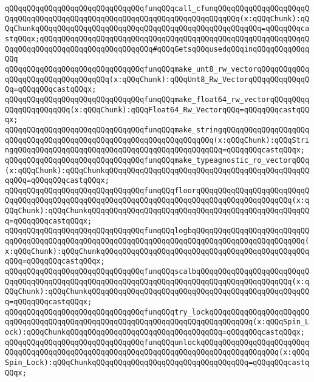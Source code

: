 \verb|qQQqqQQqqQQqqQQqqQQqqQQqqQQqqQQqfunqQQqcall_cfunqQQqqQQqqQQqqQQqqQQqqQQqqQQqqQQqqQQqqQQqqQQqqQQqqQQqqQQqqQQqqQQqqQQqqQQqqQQq(x:qQQqChunk):qQQqChunkqQQqqQQqqQQqqQQqqQQqqQQqqQQqqQQqqQQqqQQqqQQqqQQqqQQq=qQQqqQQqcastqQQqx;qQQqqQQqqQQqqQQqqQQqqQQqqQQqqQQqqQQqqQQqqQQqqQQqqQQqqQQqqQQqqQQqqQQqqQQqqQQqqQQqqQQqqQQqqQQqqQQq#qQQqGetsqQQqusedqQQqinqQQqqQQqqQQqqQQq|\newline
\verb|qQQqqQQqqQQqqQQqqQQqqQQqqQQqqQQqfunqQQqmake_unt8_rw_vectorqQQqqQQqqQQqqQQqqQQqqQQqqQQqqQQqqQQq(x:qQQqChunk):qQQqUnt8_Rw_VectorqQQqqQQqqQQqqQQq=qQQqqQQqcastqQQqx;|\newline
\verb|qQQqqQQqqQQqqQQqqQQqqQQqqQQqqQQqfunqQQqmake_float64_rw_vectorqQQqqQQqqQQqqQQqqQQqqQQq(x:qQQqChunk):qQQqFloat64_Rw_VectorqQQq=qQQqqQQqcastqQQqx;|\newline
\verb|qQQqqQQqqQQqqQQqqQQqqQQqqQQqqQQqfunqQQqmake_stringqQQqqQQqqQQqqQQqqQQqqQQqqQQqqQQqqQQqqQQqqQQqqQQqqQQqqQQqqQQqqQQqqQQq(x:qQQqChunk):qQQqStringqQQqqQQqqQQqqQQqqQQqqQQqqQQqqQQqqQQqqQQqqQQqqQQq=qQQqqQQqcastqQQqx;|\newline
\verb|qQQqqQQqqQQqqQQqqQQqqQQqqQQqqQQqfunqQQqmake_typeagnostic_ro_vectorqQQq(x:qQQqChunk):qQQqChunkqQQqqQQqqQQqqQQqqQQqqQQqqQQqqQQqqQQqqQQqqQQqqQQqqQQq=qQQqqQQqcastqQQqx;|\newline
\verb|qQQqqQQqqQQqqQQqqQQqqQQqqQQqqQQqfunqQQqfloorqQQqqQQqqQQqqQQqqQQqqQQqqQQqqQQqqQQqqQQqqQQqqQQqqQQqqQQqqQQqqQQqqQQqqQQqqQQqqQQqqQQqqQQqqQQq(x:qQQqChunk):qQQqChunkqQQqqQQqqQQqqQQqqQQqqQQqqQQqqQQqqQQqqQQqqQQqqQQqqQQq=qQQqqQQqcastqQQqx;|\newline
\verb|qQQqqQQqqQQqqQQqqQQqqQQqqQQqqQQqfunqQQqlogbqQQqqQQqqQQqqQQqqQQqqQQqqQQqqQQqqQQqqQQqqQQqqQQqqQQqqQQqqQQqqQQqqQQqqQQqqQQqqQQqqQQqqQQqqQQqqQQq(x:qQQqChunk):qQQqChunkqQQqqQQqqQQqqQQqqQQqqQQqqQQqqQQqqQQqqQQqqQQqqQQqqQQq=qQQqqQQqcastqQQqx;|\newline
\verb|qQQqqQQqqQQqqQQqqQQqqQQqqQQqqQQqfunqQQqscalbqQQqqQQqqQQqqQQqqQQqqQQqqQQqqQQqqQQqqQQqqQQqqQQqqQQqqQQqqQQqqQQqqQQqqQQqqQQqqQQqqQQqqQQqqQQq(x:qQQqChunk):qQQqChunkqQQqqQQqqQQqqQQqqQQqqQQqqQQqqQQqqQQqqQQqqQQqqQQqqQQq=qQQqqQQqcastqQQqx;|\newline
\verb|qQQqqQQqqQQqqQQqqQQqqQQqqQQqqQQqfunqQQqtry_lockqQQqqQQqqQQqqQQqqQQqqQQqqQQqqQQqqQQqqQQqqQQqqQQqqQQqqQQqqQQqqQQqqQQqqQQqqQQqqQQq(x:qQQqSpin_Lock):qQQqChunkqQQqqQQqqQQqqQQqqQQqqQQqqQQqqQQqqQQq=qQQqqQQqcastqQQqx;|\newline
\verb|qQQqqQQqqQQqqQQqqQQqqQQqqQQqqQQqfunqQQqunlockqQQqqQQqqQQqqQQqqQQqqQQqqQQqqQQqqQQqqQQqqQQqqQQqqQQqqQQqqQQqqQQqqQQqqQQqqQQqqQQqqQQqqQQq(x:qQQqSpin_Lock):qQQqChunkqQQqqQQqqQQqqQQqqQQqqQQqqQQqqQQqqQQq=qQQqqQQqcastqQQqx;|\newline
